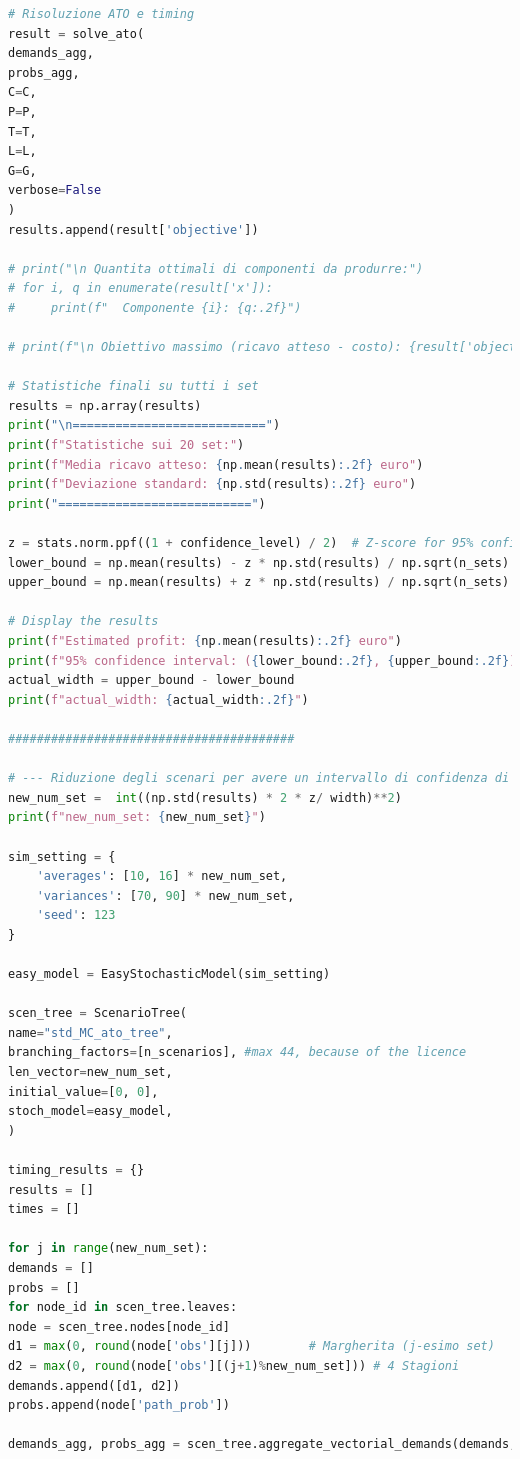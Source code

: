 \documentclass[a4paper,12pt]{article}
\begin{document}
\begin{lstlisting}[language=python,caption={Main of ATO problem},label={lst:main-ato}]
# Risoluzione ATO e timing
result = solve_ato(
demands_agg,
probs_agg,
C=C,
P=P,
T=T,
L=L,
G=G,
verbose=False
)
results.append(result['objective'])

# print("\n Quantita ottimali di componenti da produrre:")
# for i, q in enumerate(result['x']):
#     print(f"  Componente {i}: {q:.2f}")

# print(f"\n Obiettivo massimo (ricavo atteso - costo): {result['objective']:.2f} euro")

# Statistiche finali su tutti i set
results = np.array(results)
print("\n===========================")
print(f"Statistiche sui 20 set:")
print(f"Media ricavo atteso: {np.mean(results):.2f} euro")
print(f"Deviazione standard: {np.std(results):.2f} euro")
print("===========================")

z = stats.norm.ppf((1 + confidence_level) / 2)  # Z-score for 95% confidence interval
lower_bound = np.mean(results) - z * np.std(results) / np.sqrt(n_sets)
upper_bound = np.mean(results) + z * np.std(results) / np.sqrt(n_sets)

# Display the results
print(f"Estimated profit: {np.mean(results):.2f} euro")
print(f"95% confidence interval: ({lower_bound:.2f}, {upper_bound:.2f})")
actual_width = upper_bound - lower_bound
print(f"actual_width: {actual_width:.2f}")

########################################

# --- Riduzione degli scenari per avere un intervallo di confidenza di 1 euro ---
new_num_set =  int((np.std(results) * 2 * z/ width)**2)
print(f"new_num_set: {new_num_set}")

sim_setting = {
	'averages': [10, 16] * new_num_set,
	'variances': [70, 90] * new_num_set,
	'seed': 123
}

easy_model = EasyStochasticModel(sim_setting)

scen_tree = ScenarioTree(
name="std_MC_ato_tree",
branching_factors=[n_scenarios], #max 44, because of the licence
len_vector=new_num_set,
initial_value=[0, 0],
stoch_model=easy_model,
)

timing_results = {}
results = []
times = []

for j in range(new_num_set):
demands = []
probs = []
for node_id in scen_tree.leaves:
node = scen_tree.nodes[node_id]
d1 = max(0, round(node['obs'][j]))        # Margherita (j-esimo set)
d2 = max(0, round(node['obs'][(j+1)%new_num_set])) # 4 Stagioni 
demands.append([d1, d2])
probs.append(node['path_prob'])

demands_agg, probs_agg = scen_tree.aggregate_vectorial_demands(demands, probs) 


\end{lstlisting}
\end{document}
